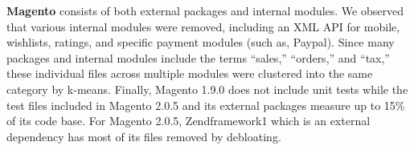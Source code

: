 
\vspace{0.5ex}
\noindent\textbf{Magento} consists of both external packages and internal modules. We observed that various internal modules were removed, including an XML API for mobile, wishlists, ratings, and specific payment modules (such as, Paypal). Since many packages and internal modules include the terms ``sales,'' ``orders,'' and ``tax,'' these individual files across multiple modules were clustered into the same category by k-means. Finally, Magento 1.9.0 does not include unit tests while the test files included in Magento 2.0.5 and its external packages measure up to 15\% of its code base. For Magento 2.0.5, Zendframework1 which is an external dependency has most of its files removed by debloating.

